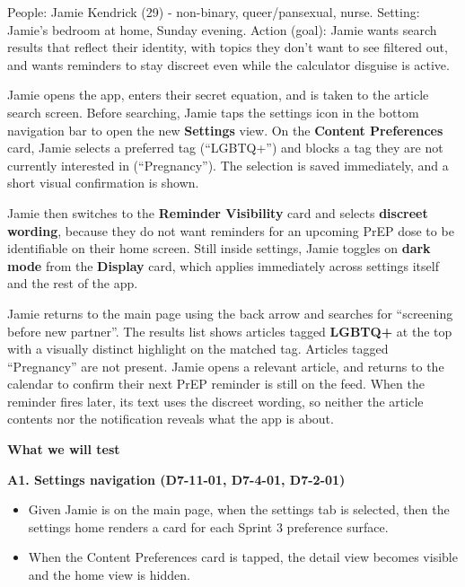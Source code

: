 \documentclass[a4paper, 12pt]{article}
\begin{document}
    People: Jamie Kendrick (29) - non-binary, queer/pansexual, nurse. Setting:
    Jamie's bedroom at home, Sunday evening. Action (goal): Jamie wants search results
    that reflect their identity, with topics they don't want to see filtered out,
    and wants reminders to stay discreet even while the calculator disguise is active.

    Jamie opens the app, enters their secret equation, and is taken to the article
    search screen. Before searching, Jamie taps the settings icon in the bottom navigation
    bar to open the new \textbf{Settings} view. On the \textbf{Content
    Preferences} card, Jamie selects a preferred tag (``LGBTQ+'') and blocks a
    tag they are not currently interested in (``Pregnancy''). The selection is saved
    immediately, and a short visual confirmation is shown.

    Jamie then switches to the \textbf{Reminder Visibility} card and selects \textbf{discreet
    wording}, because they do not want reminders for an upcoming PrEP dose to be
    identifiable on their home screen. Still inside settings, Jamie toggles on \textbf{dark
    mode} from the \textbf{Display} card, which applies immediately across
    settings itself and the rest of the app.

    Jamie returns to the main page using the back arrow and searches for ``screening
    before new partner''. The results list shows articles tagged \textbf{LGBTQ+}
    at the top with a visually distinct highlight on the matched tag. Articles tagged
    ``Pregnancy'' are not present. Jamie opens a relevant article, and returns to
    the calendar to confirm their next PrEP reminder is still on the feed. When
    the reminder fires later, its text uses the discreet wording, so neither the
    article contents nor the notification reveals what the app is about.

    \textbf{What we will test}

    \textbf{A1. Settings navigation (D7-11-01, D7-4-01, D7-2-01)}

    \begin{itemize}
        \item Given Jamie is on the main page, when the settings tab is selected,
            then the settings home renders a card for each Sprint 3 preference surface.

        \item When the Content Preferences card is tapped, the detail view
            becomes visible and the home view is hidden.
    \end{itemize}
\end{document}
